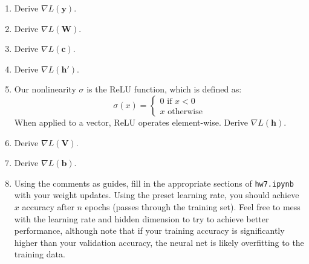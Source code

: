 \documentclass{article}
\begin{document}
\begin{enumerate}[label=\arabic*.]
\item Derive $\nabla L(\mathbf{y})$.
\item Derive $\nabla L(\mathbf{W})$.
\item Derive $\nabla L(\mathbf{c})$.
\item Derive $\nabla L(\mathbf{h'})$.
\item Our nonlinearity $\sigma$ is the ReLU function, which is defined as: $$ \sigma(x) = \begin{cases} 0 \text{ if } x < 0 \\ x \text{ otherwise} \end{cases}$$ When applied to a vector, ReLU operates element-wise. Derive $\nabla L(\mathbf{h})$.
\item Derive $\nabla L(\mathbf{V})$.
\item Derive $\nabla L(\mathbf{b})$.
\item Using the comments as guides, fill in the appropriate sections of \verb|hw7.ipynb| with your weight updates. Using the preset learning rate, you should achieve $x$ accuracy after $n$ epochs (passes through the training set). Feel free to mess with the learning rate and hidden dimension to try to achieve better performance, although note that if your training accuracy is significantly higher than your validation accuracy, the neural net is likely overfitting to the training data.
\end{enumerate}
\end{document}
